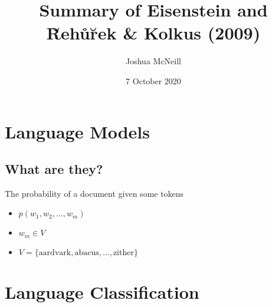 \documentclass{beamer}
\author{Joshua McNeill}
\title{Summary of Eisenstein and R̆ehůr̆ek \& Kolkus (2009)}
\date{7 October 2020}
\begin{document}
  \begin{frame}
    \titlepage
  \end{frame}

  \begin{frame}
    \tableofcontents[hideallsubsections]
  \end{frame}


  \section{Language Models}
    \subsection{What are they?}
      \begin{frame}
        \begin{block}{The probability of a document given some tokens}
          \begin{itemize}
            \item $p(w_1, w_2, \ldots, w_m)$
            \item $w_m \in V$
            \item $V = \{ \text{aardvark}, \text{abacus}, \ldots, \text{zither} \}$
          \end{itemize}
        \end{block}
      \end{frame}

  \section{Language Classification}
\end{document}
